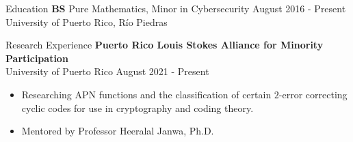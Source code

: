 \documentclass{resume} %
\begin{document}

\begin{rSection}{Education}
    \textbf{BS} \hspace*{10mm} Pure Mathematics, Minor in Cybersecurity
    \hfill{August 2016 - Present} \\
     \hspace*{17mm} University of Puerto Rico, R\'io Piedras
\end{rSection}





\begin{rSection}{Research Experience}
    \textbf{Puerto Rico Louis Stokes Alliance for Minority Participation} \\
    University of Puerto Rico \hfill{August 2021 - Present}
    \begin{itemize}
        \item Researching APN functions and the classification of certain
            $2$-error correcting cyclic codes for use in cryptography and coding
            theory.

        \item Mentored by Professor Heeralal Janwa, Ph.D.
    \end{itemize}
\end{rSection}
\end{document}
